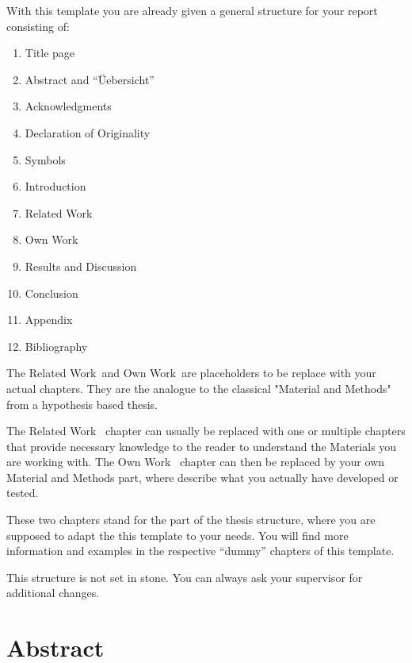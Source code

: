 With this template you are already given a general structure for your report consisting of:
\begin{enumerate}
	\item Title page
	\item Abstract and ``\"Uebersicht''
	\item Acknowledgments
	\item Declaration of Originality
	\item Symbols
	\item Introduction
	\item \textasteriskcentered Related Work\textasteriskcentered
	\item \textasteriskcentered Own Work\textasteriskcentered
	\item Results and Discussion
	\item Conclusion
	\item Appendix
	\item Bibliography
\end{enumerate} 

The \textasteriskcentered Related Work\textasteriskcentered ~and  \textasteriskcentered Own Work\textasteriskcentered ~are placeholders to be replace with your actual chapters.
They are the analogue to the classical "Material and Methods" from a hypothesis based thesis.

The \textasteriskcentered Related Work\textasteriskcentered ~ chapter can usually be replaced with one or multiple chapters that provide necessary knowledge to the reader to understand the Materials you are working with.
The \textasteriskcentered Own Work\textasteriskcentered  ~ chapter can then be replaced by your own Material and Methods part, where describe what you actually have developed or tested.

These two chapters stand for the part of the thesis structure, where you are supposed to adapt the this template to your needs.
You will find more information and examples in the respective ``dummy'' chapters of this template.

This structure is not set in stone. 
You can always ask your supervisor for additional changes.

\section{Abstract}\label{AboutAbstract}

